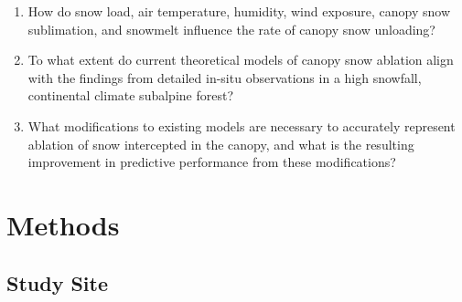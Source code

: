 \documentclass[
]{agujournal2019}
\begin{document}
\begin{enumerate}
\def\labelenumi{\arabic{enumi}.}
\item
  How do snow load, air temperature, humidity, wind exposure, canopy
  snow sublimation, and snowmelt influence the rate of canopy snow
  unloading?
\item
  To what extent do current theoretical models of canopy snow ablation
  align with the findings from detailed in-situ observations in a high
  snowfall, continental climate subalpine forest?
\item
  What modifications to existing models are necessary to accurately
  represent ablation of snow intercepted in the canopy, and what is the
  resulting improvement in predictive performance from these
  modifications?
\end{enumerate}

\section{Methods}\label{methods}

\subsection{Study Site}\label{study-site}
\end{document}
